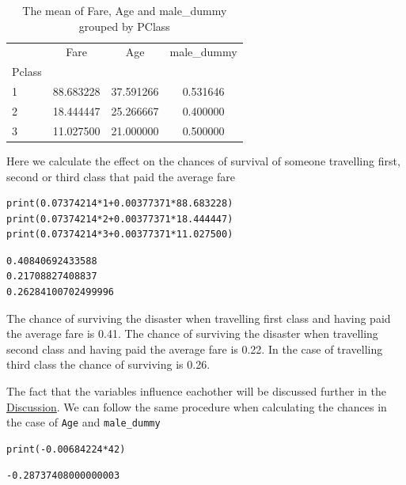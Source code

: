 \documentclass[11pt]{article}
\begin{document}
\begin{table}
\small
\begin{center}
\caption{\label{tab:tablegroupby}The mean of Fare, Age and male_dummy grouped by PClass}
\begin{tabular}{|l|c|c|c|}
\toprule
\hline
{} &       Fare &        Age &  male\_dummy \\
Pclass &            &            &             \\
\midrule
\hline
1      &  88.683228 &  37.591266 &    0.531646 \\
2      &  18.444447 &  25.266667 &    0.400000 \\
3      &  11.027500 &  21.000000 &    0.500000 \\
\bottomrule
\hline
\end{tabular}
\end{center}
\end{table}



Here we calculate the effect on the chances of survival of someone travelling first, second or third class that paid the average fare 
\begin{verbatim}
print(0.07374214*1+0.00377371*88.683228)
print(0.07374214*2+0.00377371*18.444447)
print(0.07374214*3+0.00377371*11.027500)
\end{verbatim}

\begin{verbatim}
0.40840692433588
0.21708827408837
0.26284100702499996

\end{verbatim}

The chance of surviving the disaster when travelling first class and having paid the average fare is 0.41. The chance of surviving the disaster when travelling second class and having paid the average fare is 0.22. In the case of travelling third class the chance of surviving is 0.26. 

The fact that the variables influence eachother will be discussed further in the \hyperref[sec:discussion]{Discussion}. We can follow the same procedure when calculating the chances in the case of \texttt{Age} and \texttt{male\_dummy}

\begin{verbatim}
print(-0.00684224*42)
\end{verbatim}

\begin{verbatim}
-0.28737408000000003

\end{verbatim}
\end{document}
